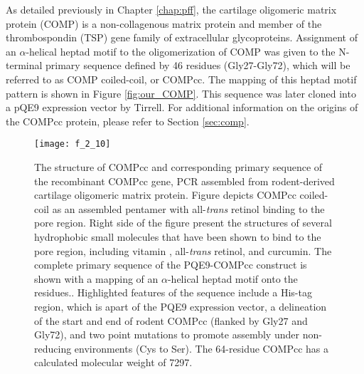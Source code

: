 \begin{refsection}
As detailed previously in Chapter \ref{chap:pff}, the cartilage oligomeric
matrix protein (COMP) is a non-collagenous matrix protein and member of the
thrombospondin (TSP) gene family of extracellular
glycoproteins.\cite{Adams2001,Smith1997,Muller1998,Hedbom1992,Oldberg1992}
Assignment of an ${\alpha}$-helical heptad motif to the oligomerization of COMP was
given to the N-terminal primary sequence defined by 46 residues (Gly27-Gly72),
which will be referred to as COMP coiled-coil, or COMPcc.\cite{Efimov1994} The
mapping of this heptad motif pattern is shown in Figure \ref{fig:our_COMP}. This
sequence was later cloned into a pQE9 expression vector by
Tirrell.\cite{Shen2006a} For additional information on the origins of the COMPcc
protein, please refer to Section \ref{sec:comp}.
\begin{figure}[h!] \centering \texttt{[image: f\_2\_10]}
    \caption[The structure of COMPcc and corresponding primary
sequence of the recombinant COMPcc gene, PCR assembled from rodent-derived
cartilage oligomeric matrix protein. Figure depicts COMPcc
coiled-coil as an assembled pentamer with all-\emph{trans} retinol binding to
the pore region.  Right side of the figure present the structures of several
hydrophobic small molecules that have been shown to bind to the pore region,
including vitamin , all-\emph{trans} retinol, and
curcumin. The complete primary sequence of the PQE9-COMPcc
construct is shown with a mapping of an ${\alpha}$-helical heptad motif onto the
residues. Highlighted features of the sequence include a His-tag
region, which is apart of the PQE9 expression vector, a delineation of the start
and end of rodent COMPcc (flanked by Gly27 and Gly72), and two point mutations
to promote assembly under non-reducing environemtns (Cys to Ser).]
    {The structure of COMPcc and corresponding primary
sequence of the recombinant COMPcc gene, PCR assembled from rodent-derived
cartilage oligomeric matrix protein.\cite{Shen2006a} Figure depicts COMPcc
coiled-coil as an assembled pentamer with all-\emph{trans} retinol binding to
the pore region.  Right side of the figure present the structures of several
hydrophobic small molecules that have been shown to bind to the pore region,
including vitamin , all-\emph{trans} retinol, and
curcumin.\cite{Gunasekar2009} The complete primary sequence of the PQE9-COMPcc
construct is shown with a mapping of an ${\alpha}$-helical heptad motif onto the
residues.\cite{Efimov1994}. Highlighted features of the sequence include a His-tag
region, which is apart of the PQE9 expression vector, a delineation of the start
and end of rodent COMPcc (flanked by Gly27 and Gly72), and two point mutations
to promote assembly under non-reducing environments (Cys to Ser). The 64-residue
COMPcc has a calculated molecular weight of \SI{7297}{\Da}.}


\end{figure}
\end{refsection}
